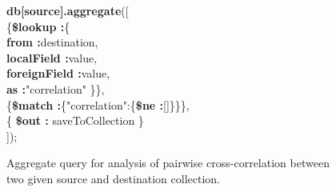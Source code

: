 \begin{figure}[H]
\begin{framed}
{\ttfamily \small{ 
\textbf{db[source].aggregate}([\\\{\textbf{\$lookup :}\{\\\textbf{from :}destination,\\    \textbf{localField :}value,\\    \textbf{foreignField :}value,\\    \textbf{as :}"correlation" \}\},\\ \{\textbf{\$match :}\{"correlation":\{\textbf{\$ne :}[]\}\}\},\\
\{ \textbf{\$out :} saveToCollection \}\\]);
}
}
\end{framed}
\caption{Aggregate query for analysis of pairwise cross-correlation between two given source and destination collection.}
\label{fig:CCQuery}
\end{figure}